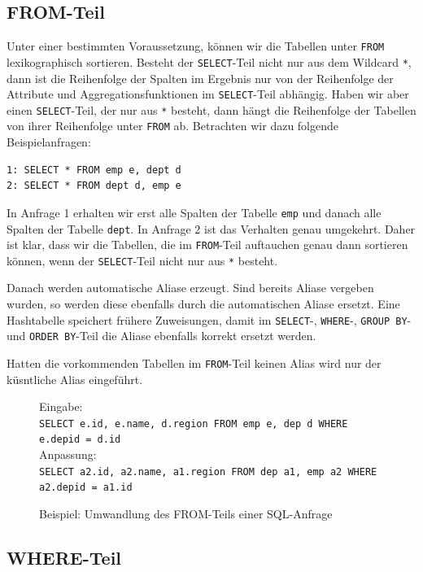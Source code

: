 \subsection{FROM-Teil}
\label{subsec:from}

Unter einer bestimmten Voraussetzung, können wir die Tabellen unter \verb|FROM| lexikographisch sortieren. Besteht der \verb|SELECT|-Teil nicht nur aus dem Wildcard \verb|*|, dann ist die Reihenfolge der Spalten im Ergebnis nur von der Reihenfolge der Attribute und Aggregationsfunktionen im \verb|SELECT|-Teil abhängig. Haben wir aber einen \verb|SELECT|-Teil, der nur aus \verb|*| besteht, dann hängt die Reihenfolge der Tabellen von ihrer Reihenfolge unter \verb|FROM| ab. Betrachten wir dazu folgende Beispielanfragen:
\begin{verbatim}
1: SELECT * FROM emp e, dept d
2: SELECT * FROM dept d, emp e
\end{verbatim}
In Anfrage 1 erhalten wir erst alle Spalten der Tabelle \verb|emp| und danach alle Spalten der Tabelle \verb|dept|. In Anfrage 2 ist das Verhalten genau umgekehrt. Daher ist klar, dass wir die Tabellen, die im \verb|FROM|-Teil auftauchen genau dann sortieren können, wenn der \verb|SELECT|-Teil nicht nur aus \verb|*| besteht.

Danach werden automatische Aliase erzeugt. Sind bereits Aliase vergeben wurden, so werden diese ebenfalls durch die automatischen Aliase ersetzt. Eine Hashtabelle speichert frühere Zuweisungen, damit im \verb|SELECT|-, \verb|WHERE|-, \verb|GROUP BY|- und \verb|ORDER BY|-Teil die Aliase ebenfalls korrekt ersetzt werden.

Hatten die vorkommenden Tabellen im \verb|FROM|-Teil keinen Alias wird nur der küsntliche Alias eingeführt.

\begin{figure}
Eingabe: \\\verb|SELECT e.id, e.name, d.region FROM emp e, dep d WHERE e.depid = d.id|\\

Anpassung: \\\verb|SELECT a2.id, a2.name, a1.region FROM dep a1, emp a2 WHERE a2.depid = a1.id|\\
\caption{Beispiel: Umwandlung des FROM-Teils einer SQL-Anfrage}
\end{figure}

\subsection{WHERE-Teil}
\label{subsec:where}

